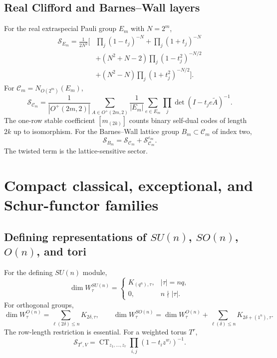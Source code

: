 \documentclass[10pt]{article}
\newcommand{\CT}{\operatorname{CT}}
\newcommand{\MGF}{\mathcal S}
\begin{document}
\subsection{Real Clifford and Barnes--Wall layers}
For the real extraspecial Pauli group $E_m$ with $N=2^m$,
\begin{equation}\label{eq:realpauli}
\boxed{\begin{aligned}
\MGF_{E_m}=\frac1{2N^2}\Big[&\prod_j(1-t_j)^{-N}+\prod_j(1+t_j)^{-N}\\
&+(N^2+N-2)\prod_j(1-t_j^2)^{-N/2}\\
&+(N^2-N)\prod_j(1+t_j^2)^{-N/2}\Big].
\end{aligned}}
\end{equation}
For $\mathcal C_m=N_{O(2^m)}(E_m)$,
\[
\MGF_{\mathcal C_m}=\frac1{|O^+(2m,2)|}\sum_{A\in O^+(2m,2)}
 \frac1{|E_m|}\sum_{e\in E_m}\prod_j\det(I-t_je\widetilde A)^{-1}.
\]
The one-row stable coefficient $[m_{(2k)}]$ counts binary self-dual codes of
length $2k$ up to isomorphism. For the Barnes--Wall lattice group
$B_m\subset\mathcal C_m$ of index two,
\begin{equation}\label{eq:bw}
\boxed{\MGF_{B_m}=\MGF_{\mathcal C_m}+\MGF_{\mathcal C_m}^{\varepsilon_m}.}
\end{equation}
The twisted term is the lattice-sensitive sector.

\section{Compact classical, exceptional, and Schur-functor families}

\subsection{Defining representations of $SU(n)$, $SO(n)$, $O(n)$, and tori}
For the defining $SU(n)$ module,
\[
\dim W_\tau^{SU(n)}=\begin{cases}K_{(q^n),\tau},&|\tau|=nq,\\0,&n\nmid|\tau|.
\end{cases}
\]
For orthogonal groups,
\[
\dim W_\tau^{O(n)}=\sum_{\ell(2\delta)\le n}K_{2\delta,\tau},\qquad
\dim W_\tau^{SO(n)}=\dim W_\tau^{O(n)}+
\sum_{\ell(\delta)\le n}K_{2\delta+(1^n),\tau}.
\]
The row-length restriction is essential. For a weighted torus $T^r$,
\[
\MGF_{T^r,V}=\CT_{z_1,\ldots,z_r}\prod_{i,j}(1-t_i z^{w_j})^{-1}.
\]
\end{document}
